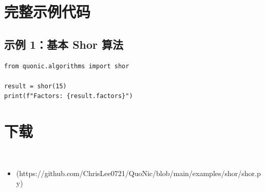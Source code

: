 \documentclass[12pt,a4paper]{article}
\begin{document}
\section{完整示例代码}

\subsection{示例 1：基本 Shor 算法}

\begin{lstlisting}[style=python]
from quonic.algorithms import shor

result = shor(15)
print(f"Factors: {result.factors}")
\end{lstlisting}


\section{下载}

\begin{itemize}
  \item [shor.py](https://github.com/ChrisLee0721/QuoNic/blob/main/examples/shor/shor.py)
\end{itemize}
\end{document}
